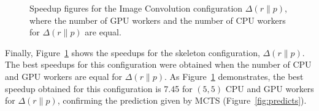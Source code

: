 \documentclass[smallextended]{svjour3}
\begin{document}
\begin{figure}
\begin{center}
\caption{Speedup figures for the Image Convolution configuration
  $\Delta(r \parallel p)$, where the number of GPU workers and the
  number of CPU workers for $\Delta(r \parallel p)$ are equal.}
\label{ver3}
\end{center}
\end{figure}

Finally, Figure~\ref{ver3} shows the speedups for the skeleton configuration, $ \Delta(r \parallel
p)$. The best speedups for this configuration were obtained when the
number of CPU and GPU workers are equal for $\Delta(r \parallel
p)$. As Figure~\ref{ver3} demonstrates, the best speedup obtained for
this configuration is 7.45 for $(5,5)$ CPU and GPU workers for $\Delta(r
\parallel p)$, confirming the
prediction given by MCTS (Figure~\ref{fig:predicts}).
\end{document}
